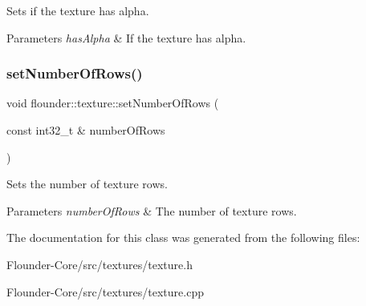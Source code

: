 Sets if the texture has alpha. 


\begin{DoxyParams}{Parameters}
{\em has\+Alpha} & If the texture has alpha. \\
\hline
\end{DoxyParams}
\mbox{\label{classflounder_1_1texture_a3afb09cb387467fcae976fb1bbe5ded7}} 
\subsubsection{\texorpdfstring{set\+Number\+Of\+Rows()}{setNumberOfRows()}}
{\footnotesize\ttfamily void flounder\+::texture\+::set\+Number\+Of\+Rows (\begin{DoxyParamCaption}\item[{const int32\+\_\+t \&}]{number\+Of\+Rows }\end{DoxyParamCaption})\hspace{0.3cm}{\ttfamily [inline]}}



Sets the number of texture rows. 


\begin{DoxyParams}{Parameters}
{\em number\+Of\+Rows} & The number of texture rows. \\
\hline
\end{DoxyParams}


The documentation for this class was generated from the following files\+:\begin{DoxyCompactItemize}
\item 
Flounder-\/\+Core/src/textures/texture.\+h\item 
Flounder-\/\+Core/src/textures/texture.\+cpp\end{DoxyCompactItemize}
